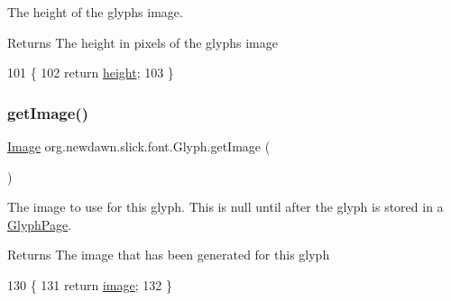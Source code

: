 The height of the glyph\textquotesingle{}s image.

\begin{DoxyReturn}{Returns}
The height in pixels of the glyphs image 
\end{DoxyReturn}

\begin{DoxyCode}
101                             \{
102         \textcolor{keywordflow}{return} \mbox{\hyperlink{classorg_1_1newdawn_1_1slick_1_1font_1_1_glyph_a43d234609f29c664ecbc31f452ba3367}{height}};
103     \}
\end{DoxyCode}
\mbox{\label{classorg_1_1newdawn_1_1slick_1_1font_1_1_glyph_a8ea5d1d3778cc284aa0740c26f29f7bf}} 
\subsubsection{\texorpdfstring{get\+Image()}{getImage()}}
{\footnotesize\ttfamily \mbox{\hyperlink{classorg_1_1newdawn_1_1slick_1_1_image}{Image}} org.\+newdawn.\+slick.\+font.\+Glyph.\+get\+Image (\begin{DoxyParamCaption}{ }\end{DoxyParamCaption})\hspace{0.3cm}{\ttfamily [inline]}}

The image to use for this glyph. This is null until after the glyph is stored in a \mbox{\hyperlink{classorg_1_1newdawn_1_1slick_1_1font_1_1_glyph_page}{Glyph\+Page}}.

\begin{DoxyReturn}{Returns}
The image that has been generated for this glyph 
\end{DoxyReturn}

\begin{DoxyCode}
130                              \{
131         \textcolor{keywordflow}{return} \mbox{\hyperlink{classorg_1_1newdawn_1_1slick_1_1font_1_1_glyph_af4fe8b4f2cdf72e687e7582fd5e210db}{image}};
132     \}
\end{DoxyCode}
\mbox{\label{classorg_1_1newdawn_1_1slick_1_1font_1_1_glyph_ac103afec6c3df00c764a30e9d5175e86}} 
